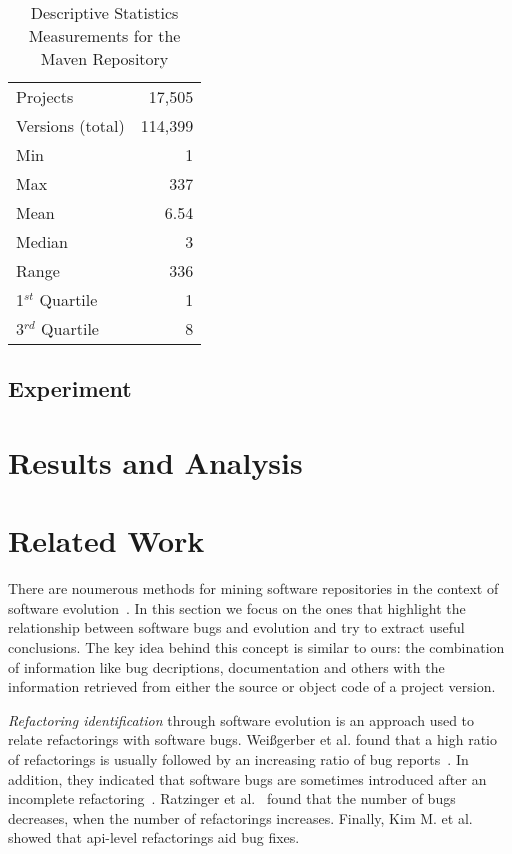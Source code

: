 \documentclass[conference]{IEEEtran}
\begin{document}
\begin{table}
\centering
\caption{Descriptive Statistics Measurements for the Maven Repository}
\label{tbl:repository}
\begin{tabular}{l r}
 \hline
Projects & 17,505\\
Versions (total) & 114,399\\
Min & 1\\
Max & 337\\
Mean & 6.54\\
Median & 3\\
Range & 336\\
1$^{st}$ Quartile & 1\\
3$^{rd}$ Quartile & 8\\
\hline
\end{tabular}
\end{table}

\subsection{Experiment}
\label{sec:exp}

\section{Results and Analysis}
\label{sec:res}

\section{Related Work}
\label{sec:rel}

There are noumerous methods for mining software repositories in the context
of software evolution~\cite{KCM07}. In this section we focus on the ones
that highlight the relationship between software bugs and evolution and try to
extract useful conclusions. The key idea behind this concept is
similar to ours: the combination of information like bug decriptions,
documentation and others with the information retrieved from either the source
or object code of a project version.

{\it Refactoring identification} through software evolution is an approach used to
relate refactorings with software bugs. Wei{\ss}gerber et al. found that a high
ratio of refactorings is usually followed by an increasing ratio of bug
reports~\cite{WD06}. In addition, they indicated that software bugs are sometimes introduced
after an incomplete refactoring~\cite{GW05}.
Ratzinger et al.~\cite{RSG08} found that the number of bugs decreases, when the number of
refactorings increases. Finally, Kim M. et al.~\cite{KCK11} showed that {\sc api}-level
refactorings aid bug fixes.
\end{document}

